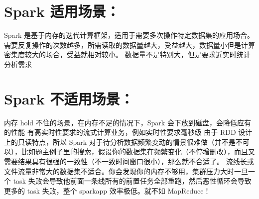 \documentclass[11pt]{article}
\begin{document}
\section{Spark 适用场景：}
\label{sec:orgaacedc3}
Spark 是基于内存的迭代计算框架，适用于需要多次操作特定数据集的应用场合。需要反复操作的次数越多，所需读取的数据量越大，受益越大，数据量小但是计算密集度较大的场合，受益就相对较小。
数据量不是特别大，但是要求近实时统计分析需求
\section{Spark 不适用场景：}
\label{sec:orgcb90fce}
内存 hold 不住的场景，在内存不足的情况下，Spark 会下放到磁盘，会降低应有的性能
有高实时性要求的流式计算业务，例如实时性要求毫秒级
由于 RDD 设计上的只读特点，所以 Spark 对于待分析数据频繁变动的情景很难做（并不是不可以），比如题主例子里的搜索，假设你的数据集在频繁变化（不停增删改），而且又需要结果具有很强的一致性（不一致时间窗口很小），那么就不合适了。
流线长或文件流量非常大的数据集不适合。你会发现你的内存不够用，集群压力大时一旦一个 task 失败会导致他前面一条线所有的前置任务全部重跑，然后恶性循环会导致更多的 task 失败，整个 sparkapp 效率极低。就不如 MapReduce！
\end{document}
